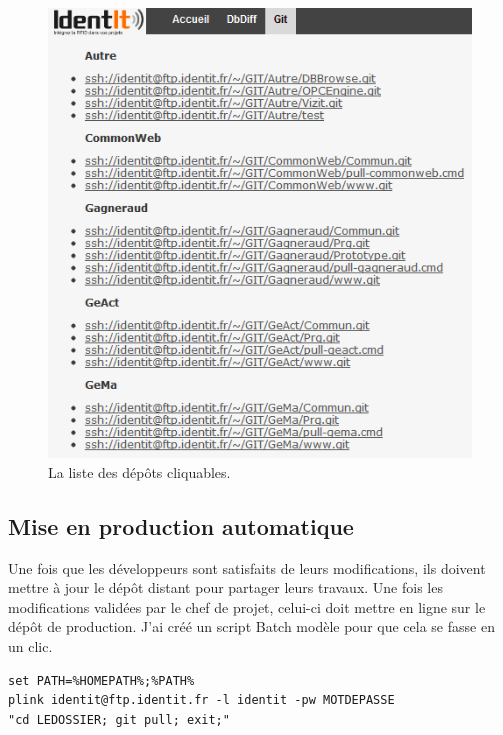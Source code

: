\begin{figure}
    \begin{center}
        \includegraphics[scale=0.7]{images/repo.png}
        \caption{La liste des dépôts cliquables.}
        \label{repo}
    \end{center}
\end{figure}

\subsection{Mise en production automatique} %
\label{sub:Mise en production automatique}

Une fois que les développeurs sont satisfaits de leurs modifications,
ils doivent mettre à jour le dépôt distant pour partager leurs travaux.
Une fois les modifications validées par le chef de projet, celui-ci doit
mettre en ligne sur le dépôt de production. J'ai créé un script Batch
\og modèle \fg{} pour que cela se fasse en un clic.\\

\begin{lstlisting}[basicstyle=\ttfamily\small, frame=trBL]
set PATH=%HOMEPATH%;%PATH%
plink identit@ftp.identit.fr -l identit -pw MOTDEPASSE
"cd LEDOSSIER; git pull; exit;"
\end{lstlisting}

